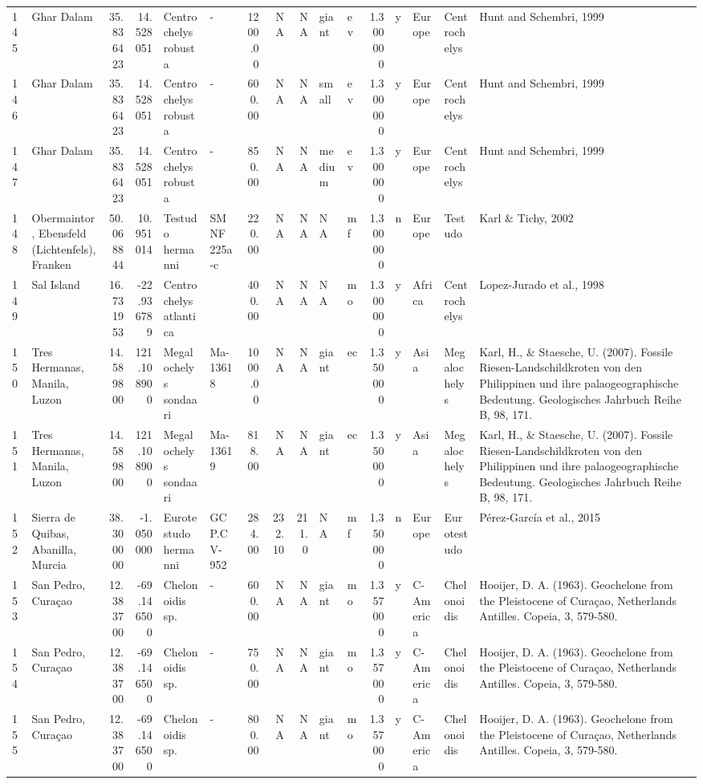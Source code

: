 \documentclass[]{article}
\begin{document}
\begin{longtable}[]{@{}llrrllrrrllrllll@{}}
145 & Ghar Dalam & 35.836423 & 14.528051 & Centrochelys robusta & - &
1200.00 & NA & NA & giant & ev & 1.300000 & y & Europe & Centrochelys &
Hunt and Schembri, 1999\tabularnewline
146 & Ghar Dalam & 35.836423 & 14.528051 & Centrochelys robusta & - &
600.00 & NA & NA & small & ev & 1.300000 & y & Europe & Centrochelys &
Hunt and Schembri, 1999\tabularnewline
147 & Ghar Dalam & 35.836423 & 14.528051 & Centrochelys robusta & - &
850.00 & NA & NA & medium & ev & 1.300000 & y & Europe & Centrochelys &
Hunt and Schembri, 1999\tabularnewline
148 & Obermaintor, Ebensfeld (Lichtenfels), Franken & 50.068844 &
10.951014 & Testudo hermanni & SMNF 225a-c & 220.00 & NA & NA & NA & mf
& 1.300000 & n & Europe & Testudo & Karl \& Tichy, 2002\tabularnewline
149 & Sal Island & 16.731953 & -22.936789 & Centrochelys atlantica & &
400.00 & NA & NA & NA & mo & 1.300000 & y & Africa & Centrochelys &
Lopez-Jurado et al., 1998\tabularnewline
150 & Tres Hermanas, Manila, Luzon & 14.589800 & 121.108900 &
Megalochelys sondaari & Ma-13618 & 1000.00 & NA & NA & giant & ec &
1.350000 & y & Asia & Megalochelys & Karl, H., \& Staesche, U. (2007).
Fossile Riesen-Landschildkroten von den Philippinen und ihre
palaogeographische Bedeutung. Geologisches Jahrbuch Reihe B, 98,
171.\tabularnewline
151 & Tres Hermanas, Manila, Luzon & 14.589800 & 121.108900 &
Megalochelys sondaari & Ma-13619 & 818.00 & NA & NA & giant & ec &
1.350000 & y & Asia & Megalochelys & Karl, H., \& Staesche, U. (2007).
Fossile Riesen-Landschildkroten von den Philippinen und ihre
palaogeographische Bedeutung. Geologisches Jahrbuch Reihe B, 98,
171.\tabularnewline
152 & Sierra de Quibas, Abanilla, Murcia & 38.300000 & -1.050000 &
Eurotestudo hermanni & GCP.CV-952 & 284.00 & 232.10 & 211.0 & NA & mf &
1.350000 & n & Europe & Eurotestudo & Pérez-García et al.,
2015\tabularnewline
153 & San Pedro, Curaçao & 12.383700 & -69.146500 & Chelonoidis sp. & -
& 600.00 & NA & NA & giant & mo & 1.357000 & y & C-America & Chelonoidis
& Hooijer, D. A. (1963). Geochelone from the Pleistocene of Curaçao,
Netherlands Antilles. Copeia, 3, 579-580.\tabularnewline
154 & San Pedro, Curaçao & 12.383700 & -69.146500 & Chelonoidis sp. & -
& 750.00 & NA & NA & giant & mo & 1.357000 & y & C-America & Chelonoidis
& Hooijer, D. A. (1963). Geochelone from the Pleistocene of Curaçao,
Netherlands Antilles. Copeia, 3, 579-580.\tabularnewline
155 & San Pedro, Curaçao & 12.383700 & -69.146500 & Chelonoidis sp. & -
& 800.00 & NA & NA & giant & mo & 1.357000 & y & C-America & Chelonoidis
& Hooijer, D. A. (1963). Geochelone from the Pleistocene of Curaçao,
Netherlands Antilles. Copeia, 3, 579-580.\tabularnewline

\end{longtable}
\end{document}
